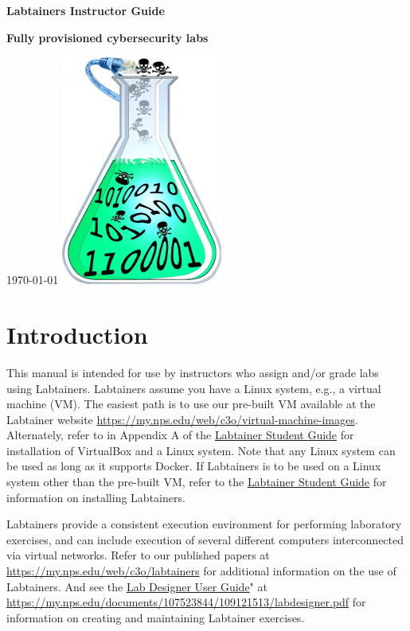 \documentclass[12pt]{article}
\begin{document}
\begin{titlepage}
\centering
\vfill
\vspace*{4\baselineskip}
{\bfseries\Large
Labtainers Instructor Guide\par
}
\vspace*{4\baselineskip}
{\bfseries
Fully provisioned cybersecurity labs\par
}
\vspace*{2\baselineskip}
\today
\vfill
\includegraphics[natwidth=200, natheight=286]{labtainer5-sm.png}
\vfill
\end{titlepage}

\section {Introduction}
This manual is intended for use by instructors who assign and/or grade
labs using Labtainers.
Labtainers assume you have a Linux system, e.g., a virtual machine (VM).  
The easiest path is to use our pre-built VM available at the Labtainer
website \url{https://my.nps.edu/web/c3o/virtual-machine-images}.
Alternately, refer to
in Appendix A of the \underline{Labtainer Student Guide} for installation of VirtualBox 
and a Linux system.
Note that any Linux system can be used as long as it supports Docker.
If Labtainers is to be used on a Linux system other than the pre-built VM,
refer to the \underline{Labtainer Student Guide} for information on
installing Labtainers.

Labtainers provide a consistent execution environment for performing
laboratory exercises, and can include execution of several different
computers interconnected via virtual networks.  Refer to our published
papers at \url{https://my.nps.edu/web/c3o/labtainers} for additional information
on the use of Labtainers.  And see the \underline{Lab Designer User Guide}"
at \url{https://my.nps.edu/documents/107523844/109121513/labdesigner.pdf} for 
information on creating and maintaining Labtainer exercises.
\end{document}
